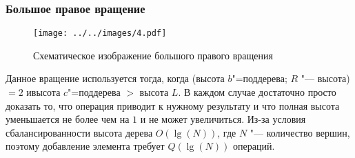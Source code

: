 \begin{frame}
    \frametitle{Большое правое вращение}

    \begin{figure}[ht]
        \texttt{[image: ../../images/4.pdf]}
        
        \caption{Схематическое изображение большого правого вращения}

    \end{figure}

    Данное вращение используется тогда, когда (высота $b$"=поддерева; $R$ "--- высота)
    $= 2$ ивысота $c$"=поддерева $ > $ высота $L$.
    В каждом случае достаточно просто доказать то, 
    что операция приводит к нужному результату и
    что полная высота уменьшается не более чем на $1$ и не может увеличиться.
    Из-за условия сбалансированности высота дерева $O(\lg(N))$,
    где $N$ "--- количество вершин, поэтому добавление элемента требует $Q(\lg(N))$ операций.
\end{frame}